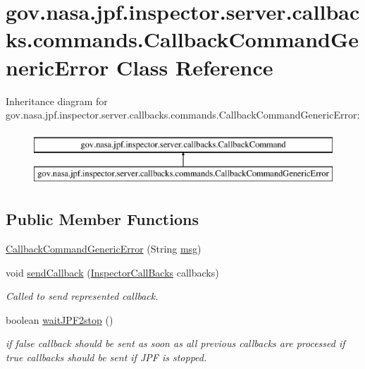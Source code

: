 \hypertarget{classgov_1_1nasa_1_1jpf_1_1inspector_1_1server_1_1callbacks_1_1commands_1_1_callback_command_generic_error}{}\section{gov.\+nasa.\+jpf.\+inspector.\+server.\+callbacks.\+commands.\+Callback\+Command\+Generic\+Error Class Reference}
\label{classgov_1_1nasa_1_1jpf_1_1inspector_1_1server_1_1callbacks_1_1commands_1_1_callback_command_generic_error}
Inheritance diagram for gov.\+nasa.\+jpf.\+inspector.\+server.\+callbacks.\+commands.\+Callback\+Command\+Generic\+Error\+:\begin{figure}[H]
\begin{center}
\leavevmode
\includegraphics[height=2.000000cm]{classgov_1_1nasa_1_1jpf_1_1inspector_1_1server_1_1callbacks_1_1commands_1_1_callback_command_generic_error}
\end{center}
\end{figure}
\subsection*{Public Member Functions}
\begin{DoxyCompactItemize}
\item 
\hyperlink{classgov_1_1nasa_1_1jpf_1_1inspector_1_1server_1_1callbacks_1_1commands_1_1_callback_command_generic_error_aa6aed5fa32c2f599b14dcb6f0b52ba77}{Callback\+Command\+Generic\+Error} (String \hyperlink{classgov_1_1nasa_1_1jpf_1_1inspector_1_1server_1_1callbacks_1_1commands_1_1_callback_command_generic_error_aba334d1e5362cadb4690711c7bab4acc}{msg})
\item 
void \hyperlink{classgov_1_1nasa_1_1jpf_1_1inspector_1_1server_1_1callbacks_1_1commands_1_1_callback_command_generic_error_a42ed40f8139f20d38913140d29bcf1f0}{send\+Callback} (\hyperlink{interfacegov_1_1nasa_1_1jpf_1_1inspector_1_1interfaces_1_1_inspector_call_backs}{Inspector\+Call\+Backs} callbacks)
\begin{DoxyCompactList}\small\item\em Called to send represented callback. \end{DoxyCompactList}\item 
boolean \hyperlink{classgov_1_1nasa_1_1jpf_1_1inspector_1_1server_1_1callbacks_1_1commands_1_1_callback_command_generic_error_a7480e70e3fdb3a61db7f915fc7e9f47c}{wait\+J\+P\+F2stop} ()
\begin{DoxyCompactList}\small\item\em if false callback should be sent as soon as all previous callbacks are processed if true callbacks should be sent if J\+PF is stopped. \end{DoxyCompactList}\end{DoxyCompactItemize}
